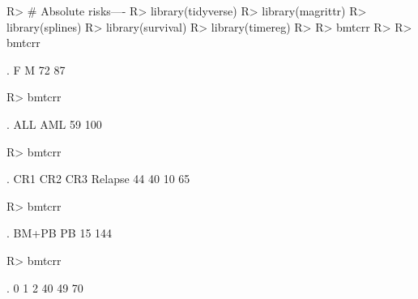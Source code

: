 \documentclass[article]{jss}
\begin{document}
\begin{CodeChunk}

\begin{CodeInput}
R> # Absolute risks----
R> library(tidyverse)
R> library(magrittr)
R> library(splines)
R> library(survival)
R> library(timereg)
R> 
R> bmtcrr %
R> 
R> bmtcrr %
\end{CodeInput}

\begin{CodeOutput}
.
 F  M 
72 87 
\end{CodeOutput}

\begin{CodeInput}
R> bmtcrr %
\end{CodeInput}

\begin{CodeOutput}
.
ALL AML 
 59 100 
\end{CodeOutput}

\begin{CodeInput}
R> bmtcrr %
\end{CodeInput}

\begin{CodeOutput}
.
    CR1     CR2     CR3 Relapse 
     44      40      10      65 
\end{CodeOutput}

\begin{CodeInput}
R> bmtcrr %
\end{CodeInput}

\begin{CodeOutput}
.
BM+PB    PB 
   15   144 
\end{CodeOutput}

\begin{CodeInput}
R> bmtcrr %
\end{CodeInput}

\begin{CodeOutput}
.
 0  1  2 
40 49 70 
\end{CodeOutput}


\end{CodeChunk}
\end{document}
